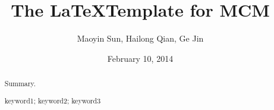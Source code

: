 \documentclass[a4paper,11pt]{article}
\title{The \LaTeX Template for MCM}
\author{\small {Maoyin Sun, Hailong Qian, Ge Jin}}
\date{February 10, 2014}
\begin{document}
\begin{abstract}
Summary. 
\begin{keywords}
keyword1; keyword2; keyword3
\end{keywords}
\end{abstract}

\maketitle

\end{document}
